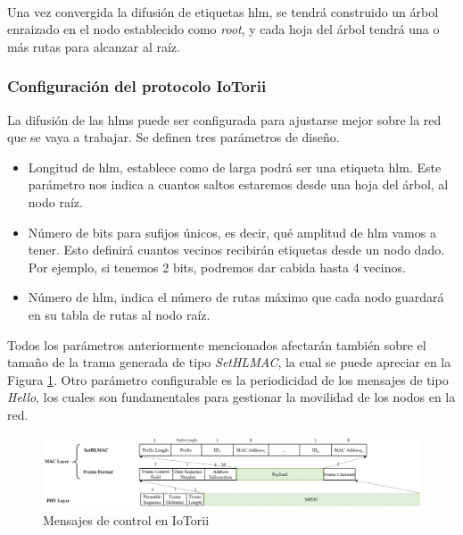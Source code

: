\\
Una vez convergida la difusión de etiquetas \gls{hlm}, se tendrá construido un árbol enraizado en el nodo establecido como \textit{root}, y cada hoja del árbol tendrá una o más rutas para alcanzar al raíz.

\newpage




\subsubsection{Configuración del protocolo IoTorii}

La difusión de las \gls{hlm}s puede ser configurada para ajustarse mejor sobre la red que se vaya a trabajar. Se definen tres parámetros de diseño.

\begin{itemize}
    \item Longitud de \gls{hlm}, establece como de larga podrá ser una etiqueta \gls{hlm}. Este parámetro nos indica a cuantos saltos estaremos desde una hoja del árbol, al nodo raíz.
    \item Número de bits para sufijos únicos, es decir, qué amplitud de \gls{hlm} vamos a tener. Esto definirá cuantos vecinos recibirán etiquetas desde un nodo dado. Por ejemplo, si tenemos 2 bits, podremos dar cabida hasta 4 vecinos.
    \item Número de \gls{hlm}, indica el número de rutas máximo que cada nodo guardará en su tabla de rutas al nodo raíz.
\end{itemize}

Todos los parámetros anteriormente mencionados afectarán también sobre el tamaño de la trama generada de tipo \textit{SetHLMAC}, la cual se puede apreciar en la Figura \ref{fig:frameformat-setHLMAC}. Otro parámetro configurable es la periodicidad de los mensajes de tipo \textit{Hello}, los cuales son fundamentales para gestionar la movilidad de los nodos en la red.

\begin{figure}[ht!]
    \centering
    \includegraphics[width=1.1\textwidth]{archivos/img/analisis/Comparation_frame_iotorii.eps}
    \caption{Mensajes de control en IoTorii \cite{rojas2021outperforming}}
    \label{fig:frameformat-setHLMAC}
\end{figure}